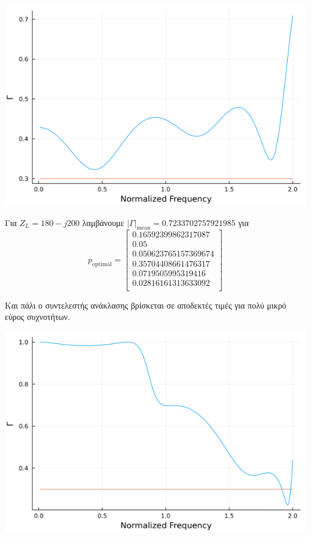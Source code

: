 \documentclass[12pt]{article}
\begin{document}
\begin{center}
    \includegraphics*[scale=0.5]{1-4-e_A.png}    
\end{center}

\newpage
Για \(Z_L = 180 - j200\) λαμβάνουμε \(|\Gamma|_\text{mean} = 0.7233702757921985\) για 
\[
    p_{\text{optimal}} = 
    \begin{bmatrix}
        0.16592399862317087 \\
        0.05 \\
        0.050623765157369674 \\
        0.35704408661476317 \\
        0.0719505995319416 \\
        0.02816161313633092 \\
    \end{bmatrix}
\]

Και πάλι ο συντελεστής ανάκλασης βρίσκεται σε αποδεκτές τιμές για πολύ μικρό εύρος συχνοτήτων. 

\begin{center}
    \includegraphics*[scale=0.5]{1-4-e_B.png}
\end{center}
\end{document}
